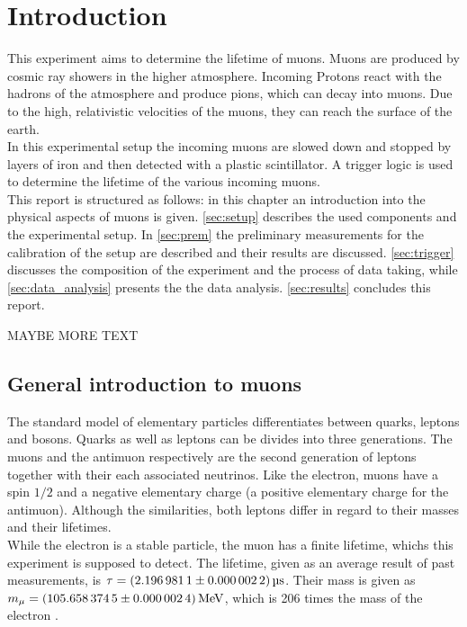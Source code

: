 \chapter{Introduction}
This experiment aims to determine the lifetime of muons. Muons are produced by cosmic ray showers 
in the higher atmosphere. Incoming Protons react with the hadrons of the atmosphere and produce 
pions, which can decay into muons. Due to the high, relativistic velocities of the muons, they can 
reach the surface of the earth. \\
In this experimental setup the incoming muons are slowed down and stopped
by layers of iron and then detected with a plastic scintillator. A trigger logic is used to determine 
the lifetime of the various incoming muons.\\
This report is structured as follows: in this chapter an introduction into the physical aspects of muons is given.
\autoref{sec:setup} describes the used components and the experimental setup. In \autoref{sec:prem}
the preliminary measurements for the calibration of the setup are described and their results are discussed. \autoref{sec:trigger} discusses
the composition of the experiment and the process of data taking, while \autoref{sec:data_analysis} 
presents the the data analysis. \autoref{sec:results} concludes this report.

MAYBE MORE TEXT

\newpage
\section{General introduction to muons}
The standard model of elementary particles differentiates between quarks, leptons and bosons.
Quarks as well as leptons can be divides into three generations. The muons and the antimuon respectively 
are the second generation of leptons together with their each associated neutrinos. Like the electron,
muons have a spin $1/2$ and a negative elementary charge (a positive elementary charge for the antimuon).
Although the similarities, both leptons differ in regard to their masses and their lifetimes.\\
While the electron is a stable particle, the muon has a finite lifetime, whichs this experiment is supposed 
to detect. The lifetime, given as an average result of past measurements, is $\tau = \SI{2.1969811 \pm 0.0000022}{\micro\second}$.
Their mass is given as $m_{\mu} = \SI{105.6583745 \pm 0.0000024}{\mega\eV}$, which 
is 206 times the mass of the electron \cite{pdg}.
